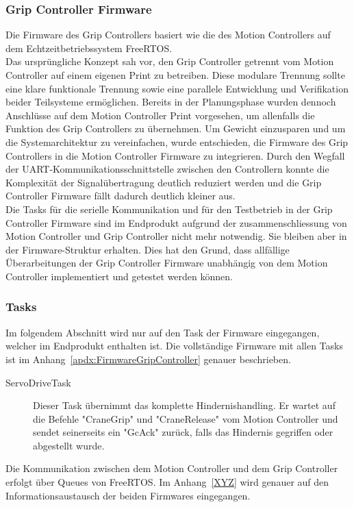\documentclass[main.tex]{subfiles} %
\begin{document}

\subsubsection{Grip Controller Firmware}

Die Firmware des Grip Controllers basiert wie die des Motion Controllers auf dem Echtzeitbetriebssystem FreeRTOS.\\
Das ursprüngliche Konzept sah vor, den Grip Controller getrennt vom Motion Controller auf einem
eigenen Print zu betreiben. Diese modulare Trennung sollte eine klare funktionale Trennung
sowie eine parallele Entwicklung und Verifikation beider Teilsysteme ermöglichen. Bereits in der Planungsphase
wurden dennoch Anschlüsse auf dem Motion Controller Print vorgesehen, um allenfalls die Funktion des
Grip Controllers zu übernehmen. Um Gewicht einzusparen und um die Systemarchitektur zu vereinfachen,
wurde entschieden, die Firmware des Grip Controllers in die Motion Controller Firmware
zu integrieren. Durch den Wegfall der UART-Kommunikationsschnittstelle zwischen den Controllern
konnte die Komplexität der Signalübertragung deutlich reduziert werden und die Grip Controller Firmware fällt dadurch
deutlich kleiner aus.\\

Die Tasks für die serielle Kommunikation und für den Testbetrieb in der Grip Controller Firmware sind im Endprodukt aufgrund
der zusammenschliessung von Motion Controller und Grip Controller nicht mehr notwendig. Sie bleiben aber 
in der Firmware-Struktur erhalten. Dies hat den Grund, dass allfällige Überarbeitungen der Grip Controller
Firmware unabhängig von dem Motion Controller implementiert und getestet werden können.\\

\subsubsection*{Tasks}
Im folgendem Abschnitt wird nur auf den Task der Firmware eingegangen, welcher im Endprodukt enthalten ist.
Die vollständige Firmware mit allen Tasks ist im Anhang~\ref{apdx:FirmwareGripController} genauer beschrieben.

\begin{description}

    \item[ServoDriveTask] Dieser Task übernimmt das komplette Hindernishandling. Er wartet auf die Befehle "CraneGrip"
    und "CraneRelease" vom Motion Controller und sendet seinerseits ein "GcAck" zurück, falls das Hindernis gegriffen oder
    abgestellt wurde.
\end{description}

Die Kommunikation zwischen dem Motion Controller und dem Grip Controller erfolgt über Queues von FreeRTOS. Im Anhang~\ref{XYZ} wird genauer auf den
Informationsaustausch der beiden Firmwares eingegangen.
\end{document}
